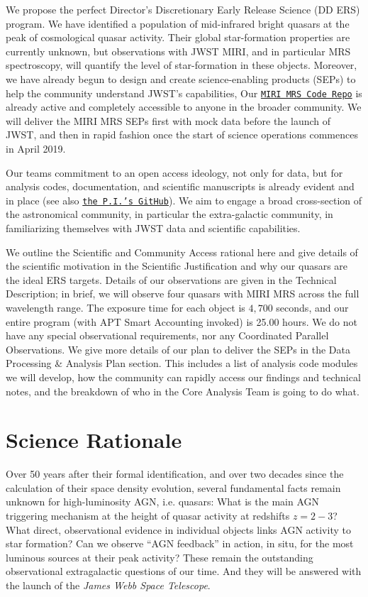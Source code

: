 We propose the perfect Director's Discretionary Early Release Science
(DD ERS) program. We have identified a population of mid-infrared
bright quasars at the peak of cosmological quasar activity. Their
global star-formation properties are currently unknown, but
observations with JWST MIRI, and in particular MRS spectroscopy, will
quantify the level of star-formation in these objects.
Moreover, we have already begun to design and create science-enabling
products (SEPs) to help the community understand JWST's capabilities,
Our \href{https://github.com/miri-mrs}{{\tt MIRI MRS Code Repo}} is
already active and completely accessible to anyone in the broader
community.  We will deliver the MIRI MRS SEPs first with mock data
before the launch of JWST, and then in rapid fashion once the start of
science operations commences in April 2019.

\smallskip \smallskip
\noindent
Our teams commitment to an open access ideology, not only for data,
but for analysis codes, documentation, and scientific manuscripts is
already evident and in place (see also
\href{https://github.com/d80b2t}{{\tt the P.I.'s GitHub}}).  We aim to
engage a broad cross-section of the astronomical community, in
particular the extra-galactic community, in familiarizing themselves
with JWST data and scientific capabilities.

\smallskip \smallskip
\noindent
We outline the Scientific and Community Access rational here and 
give details of the scientific motivation in the
Scientific Justification and why our quasars are the ideal ERS
targets.  Details of our observations are given in the Technical
Description; in brief, we will observe four quasars with MIRI MRS
across the full wavelength range. The exposure time for each object is
$4,700$ seconds, and our entire program (with APT Smart Accounting
invoked) is 25.00 hours.  We do not have any special observational requirements, nor any Coordinated
Parallel Observations.  We give more details of
our plan to deliver the SEPs in the Data Processing \& Analysis Plan
section. This includes a list of analysis code modules we will
develop, how the community can rapidly access our findings and
technical notes, and the breakdown of who in the Core Analysis Team is
going to do what.



\section*{Science Rationale}
\noindent
Over 50 years after their formal identification, and over two decades
since the calculation of their space density evolution, several
fundamental facts remain unknown for high-luminosity AGN,
i.e. quasars: What is the main AGN triggering mechanism at the height
of quasar activity at redshifts $z=2-3$? What direct,
observational evidence in individual objects links AGN activity
to star formation?  Can we observe ``AGN feedback'' in action, in situ,  
for the most luminous sources at their peak activity? These remain the
outstanding observational extragalactic questions of our time. And
they will be answered with the launch of the {\it James Webb Space
Telescope}.

